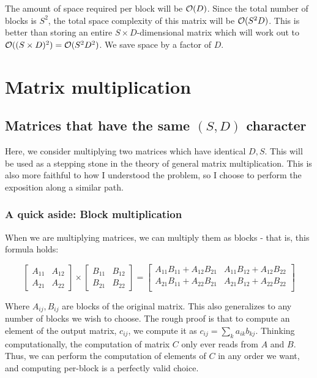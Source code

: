 \documentclass[11pt]{article}
\begin{document}
The amount of space required per block will be $\mathcal{O}(D)$.
Since the total number of blocks is $S^2$, the total space complexity of this
matrix will be $\mathcal{O}(S^2 D)$. This is better than storing an entire
$S \times D$-dimensional matrix which will work out to
$\mathcal{O}((S \times D)^2) = \mathcal{O}(S^2 D^2)$. We save space
by a factor of $D$.

\section{Matrix multiplication}
\subsection{Matrices that have the same $(S, D)$ character}
Here, we consider multiplying two matrices which have identical $D, S$. This
will be used as a stepping stone in the theory of general matrix multiplication.
This is also more faithful to how I understood the problem, so I choose to
perform the exposition along a similar path.

\subsubsection{A quick aside: Block multiplication}
When we are multiplying matrices, we can multiply them as blocks - that is,
this formula holds:

$$
\begin{bmatrix}
    A_{11} & A_{12} \\
    A_{21} & A_{22}
\end{bmatrix}
\times
\begin{bmatrix}
    B_{11} & B_{12} \\
    B_{21} & B_{22}

\end{bmatrix}
=
\begin{bmatrix}
    A_{11} B_{11} + A_{12} B_{21} & A_{11} B_{12} + A_{12} B_{22} \\
    A_{21} B_{11} + A_{22} B_{21} & A_{21} B_{12} + A_{22} B_{22} \\
\end{bmatrix}
$$

Where $A_{ij}, B_{ij}$ are blocks of the original matrix. This also
generalizes to any number of blocks we wish to choose. The rough proof is
that to compute an element of the output matrix, $c_{ij}$, we compute it as
$c_{ij} = \sum_k a_{ik} b_{kj}$. Thinking computationally, the computation of
matrix $C$ only ever reads from $A$ and $B$. Thus, we can perform the computation
of elements of $C$ in any order we want, and computing per-block is a perfectly
valid choice.
\end{document}
